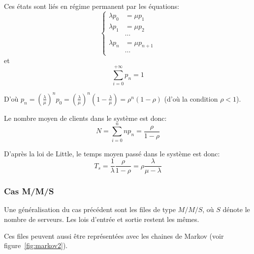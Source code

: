     Ces états sont liés en régime permanent par les équations:
      \[
        \left\{\begin{aligned}
          \lambda p_0 & = \mu p_1 \\
          \lambda p_1 & = \mu p_2 \\
          & \cdots \\
          \lambda p_n & = \mu p_{n+1} \\
          & \cdots 
        \end{aligned}\right.
      \]
    et
      \[
        \sum_{i=0}^{+\infty} p_n = 1
      \]

    D'où $p_n = \left(\frac \lambda \mu\right)^n p_0 =
     \left(\frac \lambda \mu\right)^n \left(1-\frac \lambda \mu\right) =
     \rho^n (1-\rho)$ (d'où la condition $\rho < 1$).

   Le nombre moyen de clients dans le système est donc:
     \[ N = \sum_{i=0}^n np_n = \frac \rho {1-\rho} \]

   D'après la loi de Little, le temps moyen passé dans le système est donc:
     \[
       T_s = \frac 1 \lambda \frac \rho {1-\rho}
           = \rho \frac \lambda {\mu-\lambda}
     \]

  \subsubsection{Cas M/M/S}
    Une généralisation du cas précédent sont les files de type $M/M/S$, où $S$
    dénote le nombre de serveurs. Les lois d'entrée et sortie restent les mêmes.

    Ces files peuvent aussi être représentées avec les chaines de Markov (voir
    figure~\ref{fig:markov2}).

